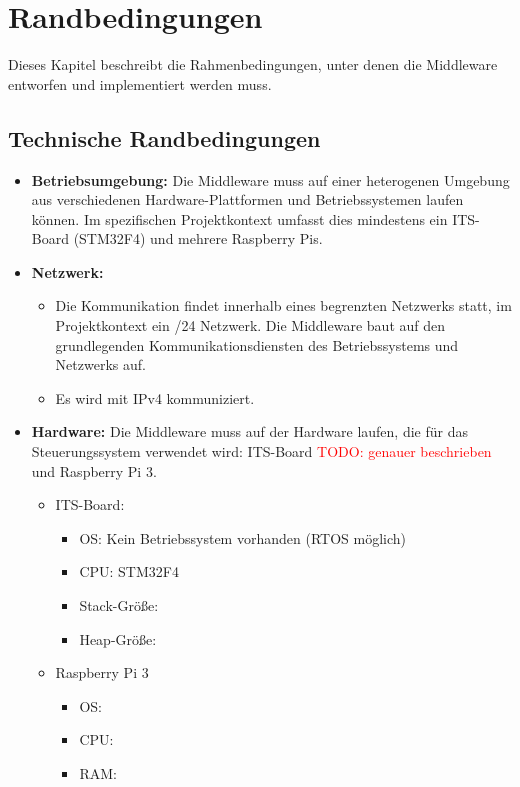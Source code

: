 

\chapter{Randbedingungen}

Dieses Kapitel beschreibt die Rahmenbedingungen, unter denen die Middleware entworfen und implementiert werden muss.

\section{Technische Randbedingungen}


\begin{itemize}
    \item \textbf{Betriebsumgebung:}  Die Middleware muss auf einer heterogenen Umgebung aus verschiedenen Hardware-Plattformen und Betriebssystemen laufen können. Im spezifischen Projektkontext umfasst dies mindestens ein ITS-Board (STM32F4) und mehrere Raspberry Pis.
    
    \item \textbf{Netzwerk:}  
    \begin{itemize}
        \item Die Kommunikation findet innerhalb eines begrenzten Netzwerks statt, im Projektkontext ein /24 Netzwerk. Die Middleware baut auf den grundlegenden Kommunikationsdiensten des Betriebssystems und Netzwerks auf.
        \item Es wird mit IPv4 kommuniziert.
    \end{itemize}
    \item \textbf{Hardware:} Die Middleware muss auf der Hardware laufen, die für das Steuerungssystem verwendet wird: ITS-Board \textcolor{red}{TODO: genauer beschrieben} und Raspberry Pi 3. 
    \begin{itemize}
    	\item ITS-Board: 
    	\begin{itemize}
    		\item OS: Kein Betriebssystem vorhanden (RTOS möglich)
    		\item CPU: STM32F4
    		\item Stack-Größe:
    		\item Heap-Größe:
    		
    	\end{itemize}
    	\item Raspberry Pi 3
    	\begin{itemize}
    		\item OS:
    		\item CPU: 
    		\item RAM:
    		

\end{itemize}
\end{itemize}
\end{itemize}
